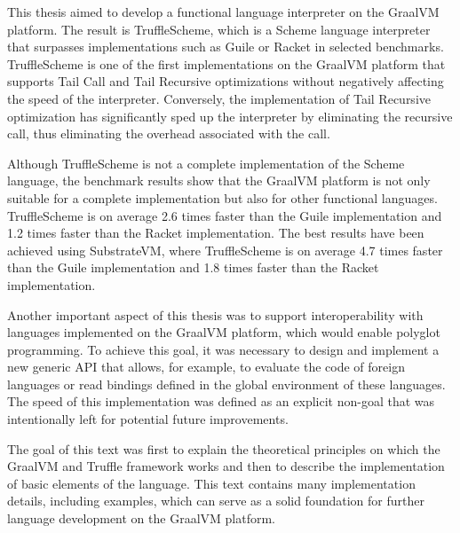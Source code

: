 \documentclass[
  master,
  biblatex,
  figures=true,
  theorems,
  sourcecodes,
  glossaries,
  index
]{kidiplom}
\begin{document}
\begin{kiconclusions}[english]
This thesis aimed to develop a functional language interpreter on the GraalVM platform. The result is TruffleScheme, which is a Scheme language interpreter that surpasses implementations such as Guile or Racket in selected benchmarks. TruffleScheme is one of the first implementations on the GraalVM platform that supports Tail Call and Tail Recursive optimizations without negatively affecting the speed of the interpreter. Conversely, the implementation of Tail Recursive optimization has significantly sped up the interpreter by eliminating the recursive call, thus eliminating the overhead associated with the call.

Although TruffleScheme is not a complete implementation of the Scheme language, the benchmark results show that the GraalVM platform is not only suitable for a complete implementation but also for other functional languages. TruffleScheme is on average 2.6 times faster than the Guile implementation and 1.2 times faster than the Racket implementation. The best results have been achieved using SubstrateVM, where TruffleScheme is on average 4.7 times faster than the Guile implementation and 1.8 times faster than the Racket implementation.

Another important aspect of this thesis was to support interoperability with languages implemented on the GraalVM platform, which would enable polyglot programming. To achieve this goal, it was necessary to design and implement a new generic API that allows, for example, to evaluate the code of foreign languages or read bindings defined in the global environment of these languages. The speed of this implementation was defined as an explicit non-goal that was intentionally left for potential future improvements.

The goal of this text was first to explain the theoretical principles on which the GraalVM and Truffle framework works and then to describe the implementation of basic elements of the language. This text contains many implementation details, including examples, which can serve as a solid foundation for further language development on the GraalVM platform.
\end{kiconclusions}

\appendix

\end{document}
